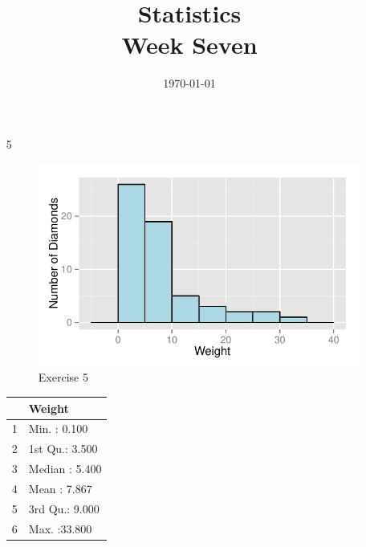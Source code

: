 \documentclass[landscape]{exam}
\title{Statistics \\ Week Seven}
\date{\today}
\author{}
\begin{document}
  \maketitle
  \tableofcontents

  \begin{enumerate}
    \item[5]
      \begin{figure}[H]
        \centering
        \includegraphics[scale = 0.8]{figures/ex05.pdf}
        \caption{Exercise 5}
      \end{figure}

      \begin{table}[H]
        \centering
        \begin{tabular}{rl}
          \toprule
                   & Weight \\
          \midrule
          1        & Min.   : 0.100   \\
          2        & 1st Qu.: 3.500   \\
          3        & Median : 5.400   \\
          4        & Mean   : 7.867   \\
          5        & 3rd Qu.: 9.000   \\
          6        & Max.   :33.800   \\
          \bottomrule
        \end{tabular}
      \end{table}


\end{enumerate}
\end{document}
